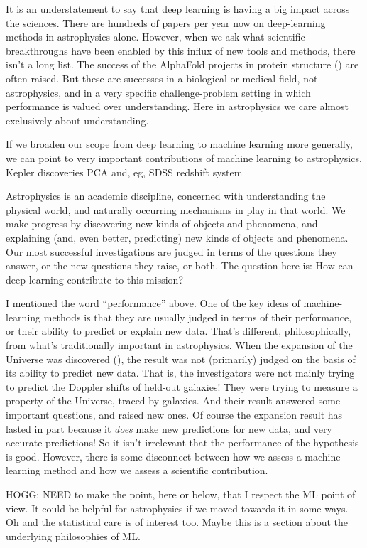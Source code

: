 \documentclass[11pt]{article}
\begin{document}
It is an understatement to say that deep learning is having a big impact across the sciences.
There are hundreds of papers per year now on deep-learning methods in astrophysics alone.
However, when we ask what scientific breakthroughs have been enabled by this influx of new tools and methods, there isn't a long list.
The success of the AlphaFold projects in protein structure (\cite{alphafold}) are often raised.
But these are successes in a biological or medical field, not astrophysics, and in a very specific challenge-problem setting in which performance is valued over understanding.
Here in astrophysics we care almost exclusively about understanding.

If we broaden our scope from deep learning to machine learning more generally, we can point to very important contributions of machine learning to astrophysics.
Kepler discoveries
PCA and, eg, SDSS redshift system

Astrophysics is an academic discipline, concerned with understanding the physical world, and naturally occurring mechanisms in play in that world.
We make progress by discovering new kinds of objects and phenomena, and explaining (and, even better, predicting) new kinds of objects and phenomena.
Our most successful investigations are judged in terms of the questions they answer, or the new questions they raise, or both.
The question here is: How can deep learning contribute to this mission?

I mentioned the word ``performance'' above.
One of the key ideas of machine-learning methods is that they are usually judged in terms of their performance, or their ability to predict or explain new data.
That's different, philosophically, from what's traditionally important in astrophysics.
When the expansion of the Universe was discovered (\cite{expansion, expansion2}), the result was not (primarily) judged on the basis of its ability to predict new data.
That is, the investigators were not mainly trying to predict the Doppler shifts of held-out galaxies!
They were trying to measure a property of the Universe, traced by galaxies.
And their result answered some important questions, and raised new ones.
Of course the expansion result has lasted in part because it \emph{does} make new predictions for new data, and very accurate predictions!
So it isn't irrelevant that the performance of the hypothesis is good.
However, there is some disconnect between how we assess a machine-learning method and how we assess a scientific contribution.

HOGG: NEED to make the point, here or below, that I respect the ML point of view. It could be helpful for astrophysics if we moved towards it in some ways. Oh and the statistical care is of interest too. Maybe this is a section about the underlying philosophies of ML.
\end{document}
